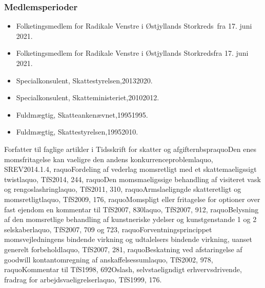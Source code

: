 \documentclass[11pt, a4paper]{awesome-cv}
\begin{document}
\begin{cvletter}
\subsubsection*{Medlemsperioder}
\begin{itemize}
\item Folketingsmedlem for Radikale Venstre i Østjyllands Storkreds fra 17. juni 2021.
\item Folketingsmedlem for Radikale Venstre i Østjyllands Storkredsfra 17. juni 2021.
\end{itemize}
\begin{itemize}
\item Specialkonsulent, Skattestyrelsen,20132020.
\item Specialkonsulent, Skatteministeriet,20102012.
\item Fuldmægtig, Skatteankenævnet,19951995.
\item Fuldmægtig, Skattestyrelsen,19952010.
\end{itemize}
Forfatter til faglige artikler i Tidsskrift for skatter og afgifternbspraquoDen enes momsfritagelse kan vaeligre den andens konkurrenceproblemlaquo, SREV2014.1.4, raquoFordeling af vederlag momsretligt med et skattemaeligssigt twistlaquo, TfS2014, 244, raquoDen momsmaeligssige behandling af visiteret vask og rengoslashringlaquo, TfS2011, 310, raquoArmslaeligngde skatteretligt og momsretligtlaquo, TfS2009, 176, raquoMomspligt eller fritagelse for optioner over fast ejendom en kommentar til TfS2007, 830laquo, TfS2007, 912, raquoBelysning af den momsretlige behandling af kunstneriske ydelser og kunstgenstande 1 og 2  selskaberlaquo, TfS2007, 709 og 723, raquoForventningsprincippet momsvejledningens bindende virkning og udtalelsers bindende virkning, uanset generelt forbeholdlaquo, TfS2007, 281, raquoBeskatning ved afstaringelse af goodwill  kontantomregning af anskaffelsessumlaquo, TfS2002, 978, raquoKommentar til TfS1998, 692Oslash, selvstaeligndigt erhvervsdrivende, fradrag for arbejdsvaeligrelserlaquo, TfS1999, 176.

\end{cvletter}
\end{document}
